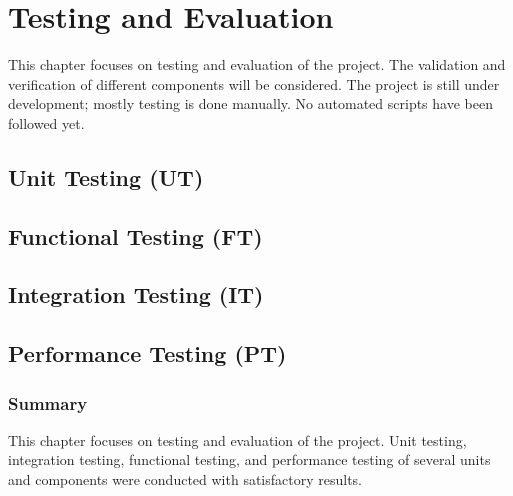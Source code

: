 \chapter{Testing and Evaluation}
\label{ch:testing}

This chapter focuses on testing and evaluation of the project. The validation and verification of different components will be considered. The project is still under development; mostly testing is done manually. No automated scripts have been followed yet.

\section{Unit Testing (UT)}


\section{Functional Testing (FT)}


\section{Integration Testing (IT)}


\section{Performance Testing (PT)}


\subsection*{Summary}
This chapter focuses on testing and evaluation of the project. Unit testing, integration testing, functional testing, and performance testing of several units and components were conducted with satisfactory results.
